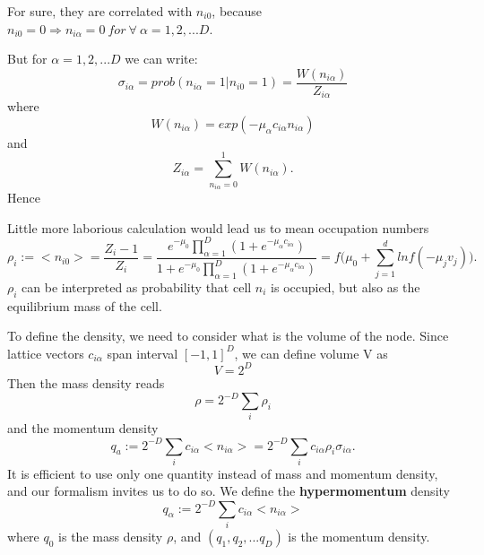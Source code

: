 For sure, they are correlated with $n_{i0}$, because $n_{i0} = 0 \Rightarrow n_{i\alpha} = 0~ for~ \forall ~ \alpha = 1,2,...D$.

But for $\alpha=1,2,...D$ we can write:
\begin{equation} \label{form2}
\sigma_{i\alpha} = prob(n_{i\alpha} = 1 | n_{i0} = 1) = \frac{W(n_{i\alpha})}{Z_{i\alpha}}
\end{equation}
where
\begin{equation}
W(n_{i\alpha}) = exp(-\mu_{\alpha}c_{i\alpha}n_{i\alpha})
\end{equation}
and
\begin{equation}
Z_{i\alpha} = \sum_{n_{i\alpha}=0}^1 W(n_{i\alpha}). 
\end{equation}
Hence

Little more laborious calculation would lead us to mean occupation numbers
\begin{equation} \label{form1}
\rho_i := <n_{i0}> = \frac{Z_i - 1}{Z_i} = \frac{e^{-\mu_0}\prod_{\alpha = 1}^D(1+e^{-{\mu_{\alpha} c_{i\alpha}}})}{1+e^{-\mu_0}\prod_{\alpha = 1}^D(1+e^{-{\mu_{\alpha} c_{i\alpha}}}) } = f\big(\mu_0 + \sum_{j=1}^d ln f(-\mu_j v_j) \big).
\end{equation}
$\rho_i$ can be interpreted as probability that cell $n_i$ is occupied, but also as the equilibrium mass of the cell.

To define the density, we need to consider what is the volume of the node. Since lattice vectors $c_{i\alpha}$ span interval $[-1,1]^D$, we can define volume V as
\begin{equation}
V = 2^D
\end{equation}
Then the mass density reads
\begin{equation}
\rho = 2^{-D} \sum_i \rho_i
\end{equation}
and the momentum density
\begin{equation}
q_a := 2^{-D} \sum_i c_{i\alpha} <n_{i\alpha}> = 2^{-D} \sum_i c_{i\alpha} \rho_i \sigma_{i\alpha}.
\end{equation}
It is efficient to use only one quantity instead of mass and momentum density, and our formalism invites us to do so. We define the \textbf{hypermomentum} density
\begin{equation} \label{hypermom}
q_{\alpha} := 2^{-D} \sum_i c_{i\alpha} <n_{i\alpha}>
\end{equation}
where $q_0$ is the mass density $\rho$, and $(q_1,q_2,...q_D)$ is the momentum density.

